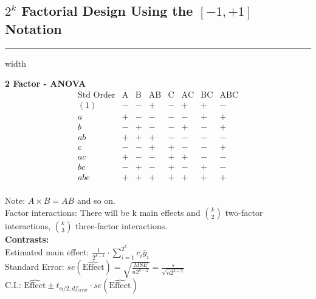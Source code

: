 \documentclass[10pt]{article}
\begin{document}
    \subsection*{$2^k$ Factorial Design Using the $[-1 , +1]$ Notation}
    \hrule width \textwidth
    \vspace{6pt}
    \begin{multicols}{2}
      \begin{flushleft}
        \textbf{2 Factor - ANOVA}
        \begin{equation*}
        \begin{array}{c|c|c|c|c|c|c|c}
          \text{Std Order} & \text{A} & \text{B} & \text{AB} & \text{C} & \text{AC} & \text{BC} & \text{ABC} \\
            \hline
            (1) & - & - & + & - & + & + & - \\
            a   & + & - & - & - & - & + & + \\
            b   & - & + & - & - & + & - & + \\
            ab  & + & + & + & - & - & - & - \\
            c   & - & - & + & + & - & - & + \\
            ac  & + & - & - & + & + & - & - \\
            bc  & - & + & - & + & - & + & - \\
            abc & + & + & + & + & + & + & + \\
        \end{array}
      \end{equation*}
      \end{flushleft}
    
        \begin{flushright}
          Note: $A \times B = AB$ and so on. \\
          Factor interactions: There will be k main effects and $\binom{k}{2}$ two-factor interactions, $\binom{k}{3}$ three-factor interactions. \\
          \textbf{Contrasts:} \\
          Estimated main effect: $\frac{1}{2^{k-1}} \cdot \sum_{i=1}^{2^k} c_i \bar{y}_i$ \\
          Standard Error: $se(\hat{\text{Effect}}) = \sqrt{\frac{MSE}{n2^{k-2}}} = \frac{s}{\sqrt{n2^{k-2}}}$ \\
          C.I.: $\hat{\text{Effect}} \pm t_{\alpha/2, df_{error}} \cdot se(\hat{\text{Effect}})$ \\
        \end{flushright}
      \end{multicols}
\end{document}
